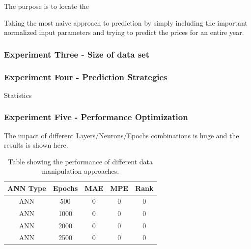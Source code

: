 
The purpose is to locate the 


Taking the most naive approach to prediction by simply including the important normalized input parameters and trying to predict the prices for an entire year. 

\subsubsection{Experiment Three - Size of data set}

\subsubsection{Experiment Four - Prediction Strategies}
Statistics


\subsubsection{Experiment Five - Performance Optimization}
The impact of different Layers/Neurons/Epochs combinations is huge and the results is shown here.

\begin{table}[H]
\centering  %
\begin{tabular}{c c c c c} %
ANN Type & Epochs & MAE & MPE & Rank \\ [0.5ex] %
\hline                  %
ANN & 500 & 0 & 0 & 0 \\ %
ANN & 1000 & 0 & 0 & 0 \\
ANN & 2000 & 0 & 0 & 0 \\
ANN & 2500 & 0 & 0 & 0 \\ [1ex] %
\hline %
\end{tabular}
\caption{Table showing the performance of different data manipulation approaches.} %
\label{table:performanceOpti} %
\end{table} 

